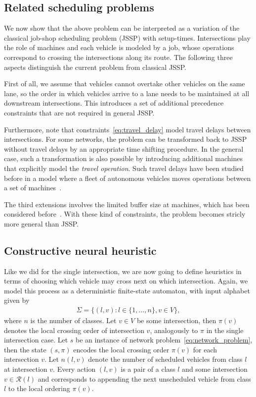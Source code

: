 \documentclass[a4paper]{article}
\theoremstyle{definition}
\theoremstyle{plain}
\begin{document}
\subsection*{Related scheduling problems}

We now show that the above problem can be interpreted as a variation of the
classical job-shop scheduling problem (JSSP) with setup-times. Intersections
play the role of machines and each vehicle is modeled by a job, whose operations
correspond to crossing the intersections along its route. The following three
aspects distinguish the current problem from classical JSSP.

First of all, we assume that vehicles cannot overtake other vehicles on the same
lane, so the order in which vehicles arrive to a lane needs to be maintained at
all downstream intersections. This introduces a set of additional precedence
constraints that are not required in general JSSP.

Furthermore, note that constraints~\eqref{eq:travel_delay} model travel delays between
intersections. For some networks, the problem can be transformed back to JSSP
without travel delays by an appropriate time shifting procedure. In the general
case, such a transformation is also possible by introducing additional machines
that explicitly model the \textit{travel operation}. Such travel delays have been studied
before in a model where a fleet of autonomous vehicles moves operations between
a set of machines~\cite{berterottiereFlexibleJobshopScheduling2024}.

The third extensions involves the limited buffer size at machines, which has
been considered before~\cite{heitmannJobshopSchedulingLimited2007}. With these
kind of constraints, the problem becomes stricly more general than JSSP.


\subsection*{Constructive neural heuristic}

Like we did for the single intersection, we are now going to define heuristics
in terms of choosing which vehicle may cross next on which intersection.
%
Again, we model this process as a deterministic finite-state automaton, with
input alphabet given by
\begin{align*}
  \Sigma = \{ (l,v) : l \in \{1, \dots, n\} , v \in V \} ,
\end{align*}
where $n$ is the number of classes.
%
Let $v \in V$ be some intersection, then $\pi(v)$ denotes the local crossing
order of intersection $v$, analogously to $\pi$ in the single intersection case.
%
Let $s$ be an instance of network problem~\eqref{eq:network_problem}, then the
state $(s, \pi)$ encodes the local crossing order $\pi(v)$ for each intersection
$v$.
%
Let $n(l, v)$ denote the number of scheduled vehicles from class $l$ at
intersection $v$.
%
Every action $(l, v)$ is a pair of a class $l$ and some intersection
$v \in \mathcal{R}(l)$ and corresponds to appending the next unscheduled vehicle
from class $l$ to the local ordering $\pi(v)$.
\end{document}
